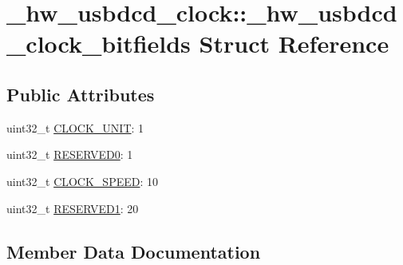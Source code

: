 \hypertarget{struct__hw__usbdcd__clock_1_1__hw__usbdcd__clock__bitfields}{}\section{\+\_\+hw\+\_\+usbdcd\+\_\+clock\+:\+:\+\_\+hw\+\_\+usbdcd\+\_\+clock\+\_\+bitfields Struct Reference}
\label{struct__hw__usbdcd__clock_1_1__hw__usbdcd__clock__bitfields}
\subsection*{Public Attributes}
\begin{DoxyCompactItemize}
\item 
uint32\+\_\+t \hyperlink{struct__hw__usbdcd__clock_1_1__hw__usbdcd__clock__bitfields_ae81ba8cdf76f5d3b76bc5312abca55a3}{C\+L\+O\+C\+K\+\_\+\+U\+N\+IT}\+: 1
\item 
uint32\+\_\+t \hyperlink{struct__hw__usbdcd__clock_1_1__hw__usbdcd__clock__bitfields_a34eef3f2e98466b5922d7ecb96b07d58}{R\+E\+S\+E\+R\+V\+E\+D0}\+: 1
\item 
uint32\+\_\+t \hyperlink{struct__hw__usbdcd__clock_1_1__hw__usbdcd__clock__bitfields_a2c5ba08ee515e98eff36f1a86f33fcb1}{C\+L\+O\+C\+K\+\_\+\+S\+P\+E\+ED}\+: 10
\item 
uint32\+\_\+t \hyperlink{struct__hw__usbdcd__clock_1_1__hw__usbdcd__clock__bitfields_a83a381c9b6ce7de87ea7f6b4a76911f0}{R\+E\+S\+E\+R\+V\+E\+D1}\+: 20
\end{DoxyCompactItemize}


\subsection{Member Data Documentation}
